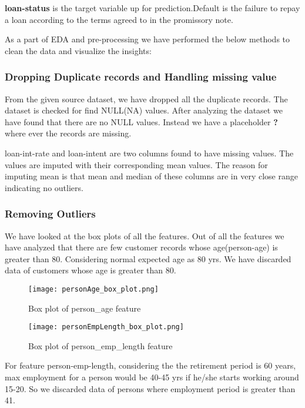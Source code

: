 \documentclass[12pt]{article}
\begin{document}
\textbf{loan-status} is the target variable up for prediction.Default is the failure to repay a loan according to the terms agreed to in the promissory note.

As a part of EDA and pre-processing we have performed the below methods to clean the data and visualize the insights:

\subsubsection{Dropping Duplicate records and Handling missing value}
From the given source dataset, we have dropped all the duplicate records. The dataset is checked for find NULL(NA) values. After analyzing the dataset we have found that there are no NULL values. Instead we have a placeholder \textbf{?} where ever the records are missing.

loan-int-rate and loan-intent are two columns found to have missing values.  The values are imputed with their corresponding mean values. The reason for imputing mean is that mean and median of these columns are in very close range indicating no outliers.

\subsubsection{Removing Outliers}We have looked at the box plots of all the features. Out of all the features we have analyzed that there are few customer records whose age(person-age) is greater than 80. Considering normal expected age as 80 yrs. We have discarded data of customers whose age is greater than 80.

\begin{figure}[!htb] %
\centering
\texttt{[image: personAge\_box\_plot.png]}
\caption{Box plot of person\_age feature}
\end{figure}



\begin{figure}[!htb] %
\centering
\texttt{[image: personEmpLength\_box\_plot.png]}
\caption{Box plot of person\_emp\_length feature}
\end{figure}

For feature person-emp-length, considering the the retirement period is 60 years, max employment for a person would be 40-45 yrs if he/she starts working around 15-20. So we discarded data of persons where employment period is greater than 41.
\end{document}
